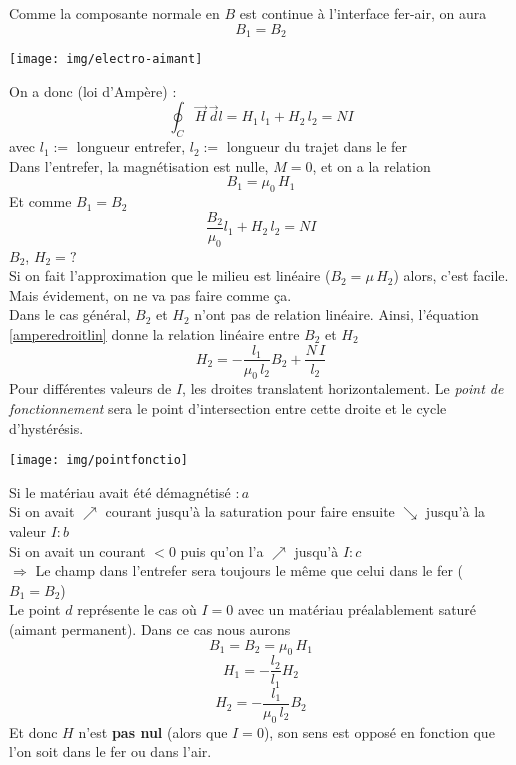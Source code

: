 \documentclass	[11pt, a4paper, openany]{book}
\begin{document}
	Comme la composante normale en $B$ est continue à l'interface fer-air, on aura 
	\begin{equation}
		B_1=B_2
	\end{equation}
	\begin{center}
		\texttt{[image: img/electro-aimant]}
	\end{center}
	On a donc (loi d'Ampère) : \begin{equation}
	\oint_C\vec H\,\vec dl=H_1\,l_1+H_2\,l_2=NI
	\end{equation}
	avec $l_1:=$ longueur entrefer, $l_2:=$ longueur du trajet dans le fer\\
	Dans l'entrefer, la magnétisation est nulle, $M=0$, et on a la relation \begin{equation}
	B_1=\mu_0\,H_1
	\end{equation}\label{amperedroitlin}
	Et comme $B_1=B_2$\begin{equation}
	\frac{B_2}{\mu_0}l_1+H_2\,l_2=NI
	\end{equation}
	$B_2$, $H_2=?$\\
	Si on fait l'approximation que le milieu est linéaire ($B_2=\mu\,H_2$) alors, c'est facile. Mais évidement, on ne va pas faire comme ça.\\
	Dans le cas général, $B_2$ et $H_2$ n'ont pas de relation linéaire. Ainsi, l'équation \eqref{amperedroitlin} donne la relation linéaire entre $B_2$ et $H_2$ \begin{equation}
	H_2=-\frac{l_1}{\mu_0\,l_2}B_2+\frac{N\,I}{l_2}
	\end{equation}
	Pour différentes valeurs de $I$, les droites translatent horizontalement. Le \textit{point de fonctionnement} sera le point d'intersection entre cette droite et le cycle d'hystérésis.
	\begin{center}
		\texttt{[image: img/pointfonctio]}
	\end{center}
	Si le matériau avait été démagnétisé $:a$\\ Si on avait $\nearrow$ courant jusqu'à la saturation pour faire ensuite $\searrow$ jusqu'à la valeur $I:b$ \\Si on avait un courant $<0$ puis qu'on l'a $\nearrow$ jusqu'à $I: c$\\ 
	$\Rightarrow$ Le champ dans l'entrefer sera toujours le même que celui dans le fer ($B_1=B_2$)\\
	
	Le point $d$ représente le cas où $I=0$ avec un matériau préalablement saturé (aimant permanent). Dans ce cas nous aurons $$B_1=B_2=\mu_0\,H_1$$\begin{equation}
	H_1=-\frac{l_2}{l_1}H_2
	\end{equation}
	$$H_2=-\frac{l_1}{\mu_0\,l_2}B_2$$ Et donc $H$ n'est \textbf{pas nul} (alors que $I=0$), son sens est opposé en fonction que l'on soit dans le fer ou dans l'air.
\end{document}

